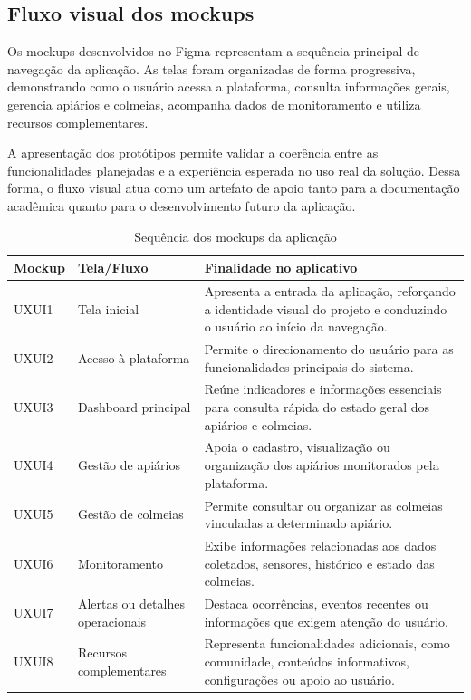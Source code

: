 \documentclass[11pt,a4paper]{article}
\begin{document}
\subsection{Fluxo visual dos mockups}

Os mockups desenvolvidos no Figma representam a sequência principal de navegação da aplicação. As telas foram organizadas de forma progressiva, demonstrando como o usuário acessa a plataforma, consulta informações gerais, gerencia apiários e colmeias, acompanha dados de monitoramento e utiliza recursos complementares.

A apresentação dos protótipos permite validar a coerência entre as funcionalidades planejadas e a experiência esperada no uso real da solução. Dessa forma, o fluxo visual atua como um artefato de apoio tanto para a documentação acadêmica quanto para o desenvolvimento futuro da aplicação.

\begin{table}[H]
\centering
\caption{Sequência dos mockups da aplicação}
\label{tab:sequencia-mockups}
\begin{tabular}{|p{2.5cm}|p{4.2cm}|p{7.3cm}|}
\hline
\textbf{Mockup} & \textbf{Tela/Fluxo} & \textbf{Finalidade no aplicativo} \\
\hline
UXUI1 & Tela inicial & Apresenta a entrada da aplicação, reforçando a identidade visual do projeto e conduzindo o usuário ao início da navegação. \\
\hline
UXUI2 & Acesso à plataforma & Permite o direcionamento do usuário para as funcionalidades principais do sistema. \\
\hline
UXUI3 & Dashboard principal & Reúne indicadores e informações essenciais para consulta rápida do estado geral dos apiários e colmeias. \\
\hline
UXUI4 & Gestão de apiários & Apoia o cadastro, visualização ou organização dos apiários monitorados pela plataforma. \\
\hline
UXUI5 & Gestão de colmeias & Permite consultar ou organizar as colmeias vinculadas a determinado apiário. \\
\hline
UXUI6 & Monitoramento & Exibe informações relacionadas aos dados coletados, sensores, histórico e estado das colmeias. \\
\hline
UXUI7 & Alertas ou detalhes operacionais & Destaca ocorrências, eventos recentes ou informações que exigem atenção do usuário. \\
\hline
UXUI8 & Recursos complementares & Representa funcionalidades adicionais, como comunidade, conteúdos informativos, configurações ou apoio ao usuário. \\
\hline
\end{tabular}
\end{table}
\end{document}
